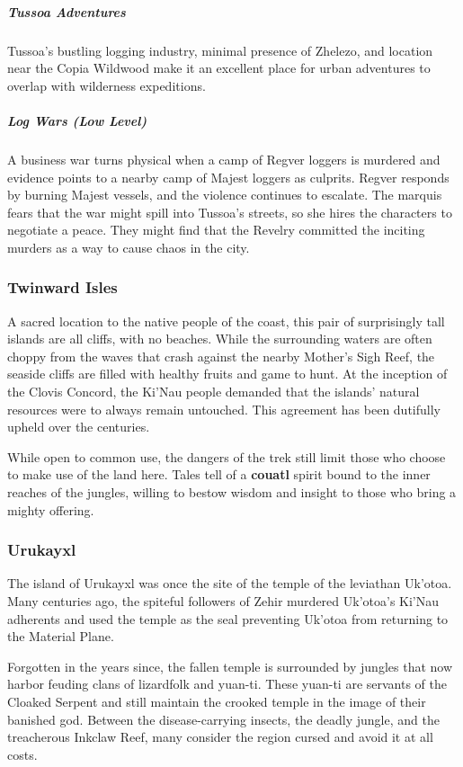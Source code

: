 \documentclass[10pt,a4paper,twoside,bg=print,twocolumn,openany,nodeprecatedcode]{dndbook}
\begin{document}
\subparagraph{Tussoa Adventures}
Tussoa's bustling logging industry, minimal presence of Zhelezo, and location near the Copia Wildwood make it an excellent place for urban adventures to overlap with wilderness expeditions.

\subparagraph{Log Wars (Low Level)}
A business war turns physical when a camp of Regver loggers is murdered and evidence points to a nearby camp of Majest loggers as culprits. Regver responds by burning Majest vessels, and the violence continues to escalate. The marquis fears that the war might spill into Tussoa's streets, so she hires the characters to negotiate a peace. They might find that the Revelry committed the inciting murders as a way to cause chaos in the city.

\subsubsection{Twinward Isles}
A sacred location to the native people of the coast, this pair of surprisingly tall islands are all cliffs, with no beaches. While the surrounding waters are often choppy from the waves that crash against the nearby Mother's Sigh Reef, the seaside cliffs are filled with healthy fruits and game to hunt. At the inception of the Clovis Concord, the Ki'Nau people demanded that the islands' natural resources were to always remain untouched. This agreement has been dutifully upheld over the centuries.

While open to common use, the dangers of the trek still limit those who choose to make use of the land here. Tales tell of a \textbf{couatl} spirit bound to the inner reaches of the jungles, willing to bestow wisdom and insight to those who bring a mighty offering.

\subsubsection{Urukayxl}
The island of Urukayxl was once the site of the temple of the leviathan Uk'otoa. Many centuries ago, the spiteful followers of Zehir murdered Uk'otoa's Ki'Nau adherents and used the temple as the seal preventing Uk'otoa from returning to the Material Plane.

Forgotten in the years since, the fallen temple is surrounded by jungles that now harbor feuding clans of lizardfolk and yuan-ti. These yuan-ti are servants of the Cloaked Serpent and still maintain the crooked temple in the image of their banished god. Between the disease-carrying insects, the deadly jungle, and the treacherous Inkclaw Reef, many consider the region cursed and avoid it at all costs.
\end{document}
